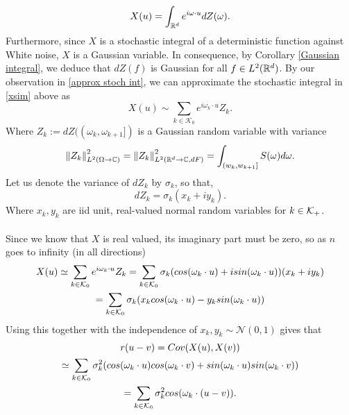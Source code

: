 \documentclass[
    a4paper,
    DIV=14,
    abstract=true,
    numbers=noenddot
]{scrartcl}
\begin{document}
\begin{equation}\label{xsim}
	X(u)=\int_{\mathbb{R}^d}e^{i\omega\cdot u} dZ(\omega).
\end{equation}
Furthermore, since $X$ is a stochastic integral of a deterministic function against White noise,  $X$ is a Gaussian variable. In consequence, by Corollary \eqref{Gaussian integral}, we deduce that $dZ(f)$ is Gaussian for all  $f\in L^2(\mathbb{R}^d)$. By our observation in \eqref{approx stoch int}, we can approximate the stochastic integral in \eqref{xsim} above as
\begin{equation*}
	X(u)\sim \sum_{k\in \mathcal{K}_0} e^{i\omega_k\cdot u}Z_k.
\end{equation*}
Where $Z_k:=dZ((\omega_k,\omega_{k+1}])$ is a Gaussian random variable with variance
\begin{equation*}
	\left\lVert Z_k \right\rVert^2_{L^2(\Omega\to\mathbb{C})}=\left\lVert Z_k \right\rVert^2_{L^2(\mathbb{R}^d\to\mathbb{C},dF)}=\int_{(w_k,w_{k+1}]}S(\omega)d\omega.
\end{equation*}
Let us denote the variance of $dZ_k$ by  $\sigma _k$, so that,
\begin{equation*}
	dZ_k=\sigma _k(x_k+iy_k).
\end{equation*}
Where $x_k,y_k$ are iid unit, real-valued normal random variables for $k \in \mathcal{K}_+$.
\\
\\
Since we know that $X$ is real valued, its imaginary part must be zero, so as $n$ goes to infinity (in all directions)
\begin{multline}\label{sr+}
	X(u)\simeq\sum_{k\in \mathcal{K}_0} e^{i\omega_k\cdot u}Z_k=\sum_{k\in \mathcal{K}_0}\sigma _k(cos(\omega_k\cdot u) + i sin(\omega_k\cdot u))(x_k +iy_k)\\
	=\sum_{k\in \mathcal{K}_0}\sigma _k(x_{k}cos(\omega_k\cdot u)-y_{k}sin(\omega_k\cdot u))
\end{multline}
Using this together with the independence of $x_k,y_k\sim\mathcal{N}(0,1)$ gives that
\begin{multline}\label{eq1}
	r(u-v)=Cov(X(u),X(v))\\\simeq \sum_{k\in \mathcal{K}_0} \sigma_k^2(cos(\omega_k\cdot u)cos(\omega_k\cdot v)+sin(\omega_k\cdot u)sin(\omega_k\cdot v))\\
	=\sum_{k\in \mathcal{K}_0} \sigma _k^2 cos(\omega_k\cdot(u-v)).
\end{multline}
\end{document}
